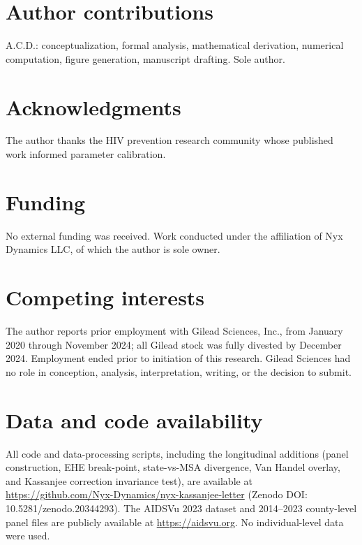 \documentclass[12pt]{article}
\begin{document}

\section*{Author contributions}

A.C.D.: conceptualization, formal analysis, mathematical derivation, numerical computation, figure generation, manuscript drafting. Sole author.

\section*{Acknowledgments}

The author thanks the HIV prevention research community whose published work informed parameter calibration.

\section*{Funding}

No external funding was received. Work conducted under the affiliation of Nyx Dynamics LLC, of which the author is sole owner.

\section*{Competing interests}

The author reports prior employment with Gilead Sciences, Inc., from January 2020 through November 2024; all Gilead stock was fully divested by December 2024. Employment ended prior to initiation of this research. Gilead Sciences had no role in conception, analysis, interpretation, writing, or the decision to submit.

\section*{Data and code availability}

All code and data-processing scripts, including the longitudinal additions (panel construction, EHE break-point, state-vs-MSA divergence, Van Handel overlay, and Kassanjee correction invariance test), are available at \url{https://github.com/Nyx-Dynamics/nyx-kassanjee-letter} (Zenodo DOI: 10.5281/zenodo.20344293). The AIDSVu 2023 dataset and 2014--2023 county-level panel files are publicly available at \url{https://aidsvu.org}. No individual-level data were used.
\end{document}
